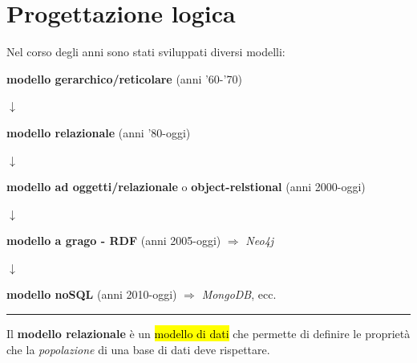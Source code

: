 \documentclass[12pt, a4paper, oneside]{book}
\begin{document}
    

    \chapter{Progettazione logica}
    Nel corso degli anni sono stati sviluppati diversi modelli:
    \begin{description}
      \centering
      \item \textbf{modello gerarchico/reticolare} (anni '60-'70)
      \item $\downarrow$
      \item \textcolor{azzurrino}{\textbf{modello relazionale}} (anni '80-oggi)
      \item $\downarrow$
      \item \textbf{modello ad oggetti/relazionale} o \textbf{object-relstional} (anni 2000-oggi)
      \item $\downarrow$
      \item \textbf{modello a grago - RDF} (anni 2005-oggi) $\Rightarrow$ \textit{Neo4j}
      \item $\downarrow$
      \item \textbf{modello noSQL} (anni 2010-oggi) $\Rightarrow$ \textit{MongoDB}, ecc.
    \end{description}
    
    \noindent\rule{\linewidth}{0.4pt}

    Il \textbf{modello relazionale} è un \hl{modello di dati} che permette di definire le proprietà che la \textit{popolazione} di una base di dati deve rispettare.

    
\end{document}
